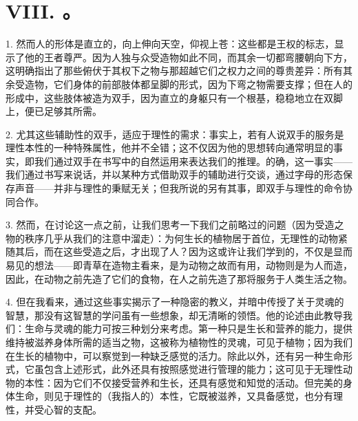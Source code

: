 \section{VIII. 。}

1. 然而人的形体是直立的，向上伸向天空，仰视上苍：这些都是王权的标志，显示了他的王者尊严。因为人独与众受造物如此不同，而其余一切都弯腰朝向下方，这明确指出了那些俯伏于其权下之物与那超越它们之权力之间的尊贵差异：所有其余受造物，它们身体的前部肢体都呈脚的形式，因为下弯之物需要支撑；但在人的形成中，这些肢体被造为双手，因为直立的身躯只有一个根基，稳稳地立在双脚上，便已足够其所需。\par

2. 尤其这些辅助性的双手，适应于理性的需求：事实上，若有人说双手的服务是理性本性的一种特殊属性，他并不全错；这不仅因为他的思想转向通常明显的事实，即我们通过双手在书写中的自然运用来表达我们的推理。的确，这一事实——我们通过书写来说话，并以某种方式借助双手的辅助进行交谈，通过字母的形态保存声音——并非与理性的秉赋无关；但我所说的另有其事，即双手与理性的命令协同合作。\par

3. 然而，在讨论这一点之前，让我们思考一下我们之前略过的问题（因为受造之物的秩序几乎从我们的注意中溜走）：为何生长的植物居于首位，无理性的动物紧随其后，而在这些受造之后，才出现了人？因为这或许让我们学到的，不仅是显而易见的想法——即青草在造物主看来，是为动物之故而有用，动物则是为人而造，因此，在动物之前先造了它们的食物，在人之前先造了那将服务于人类生活之物。\par

4. 但在我看来，通过这些事实揭示了一种隐密的教义，并暗中传授了关于灵魂的智慧，那没有这智慧的学问虽有一些想象，却无清晰的领悟。他的论述由此教导我们：生命与灵魂的能力可按三种划分来考虑。第一种只是生长和营养的能力，提供维持被滋养身体所需的适当之物，这被称为植物性的灵魂，可见于植物；因为我们在生长的植物中，可以察觉到一种缺乏感觉的活力。除此以外，还有另一种生命形式，它虽包含上述形式，此外还具有按照感觉进行管理的能力；这可见于无理性动物的本性：因为它们不仅接受营养和生长，还具有感觉和知觉的活动。但完美的身体生命，则见于理性的（我指人的）本性，它既被滋养，又具备感觉，也分有理性，并受心智的支配。\par

